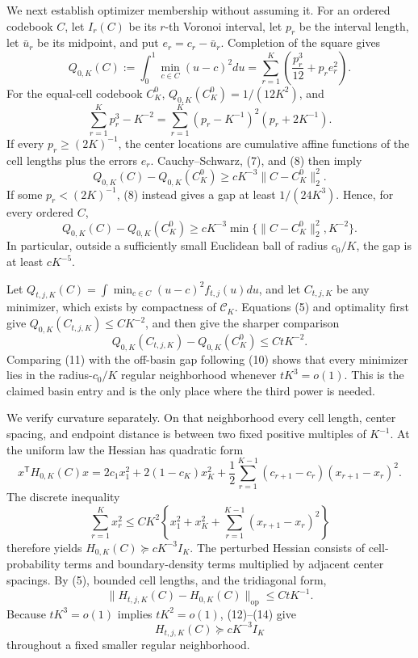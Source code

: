 We next establish optimizer membership without assuming it.  For an ordered codebook \(C\), let \(I_r(C)\) be its \(r\)-th Voronoi interval, let \(p_r\) be the interval length, let \(\bar u_r\) be its midpoint, and put \(e_r=c_r-\bar u_r\).  Completion of the square gives
\[
 Q_{0,K}(C):=\int_0^1\min_{c\in C}(u-c)^2du
 =\sum_{r=1}^K\left(\frac{p_r^3}{12}+p_re_r^2\right).                                    \tag{7}
\]
For the equal-cell codebook \(C_K^0\), \(Q_{0,K}(C_K^0)=1/(12K^2)\), and
\[
 \sum_{r=1}^Kp_r^3-K^{-2}
 =\sum_{r=1}^K(p_r-K^{-1})^2(p_r+2K^{-1}).                                                \tag{8}
\]
If every \(p_r\geq(2K)^{-1}\), the center locations are cumulative affine functions of the cell lengths plus the errors \(e_r\).  Cauchy--Schwarz, (7), and (8) then imply
\[
 Q_{0,K}(C)-Q_{0,K}(C_K^0)\geq cK^{-3}\|C-C_K^0\|_2^2.                                 \tag{9}
\]
If some \(p_r<(2K)^{-1}\), (8) instead gives a gap at least \(1/(24K^3)\).  Hence, for every ordered \(C\),
\[
 Q_{0,K}(C)-Q_{0,K}(C_K^0)
 \geq cK^{-3}\min\{\|C-C_K^0\|_2^2,K^{-2}\}.                                         \tag{10}
\]
In particular, outside a sufficiently small Euclidean ball of radius \(c_0/K\), the gap is at least \(cK^{-5}\).

Let \(Q_{t,j,K}(C)=\int\min_{c\in C}(u-c)^2f_{t,j}(u)du\), and let \(C_{t,j,K}\) be any minimizer, which exists by compactness of \(\mathcal C_K\).  Equations (5) and optimality first give \(Q_{0,K}(C_{t,j,K})\leq C K^{-2}\), and then give the sharper comparison
\[
 Q_{0,K}(C_{t,j,K})-Q_{0,K}(C_K^0)\leq CtK^{-2}.                                         \tag{11}
\]
Comparing (11) with the off-basin gap following (10) shows that every minimizer lies in the radius-\(c_0/K\) regular neighborhood whenever \(tK^3=o(1)\).  This is the claimed basin entry and is the only place where the third power is needed.

We verify curvature separately.  On that neighborhood every cell length, center spacing, and endpoint distance is between two fixed positive multiples of \(K^{-1}\).  At the uniform law the Hessian has quadratic form
\[
 x^{\mathsf T}H_{0,K}(C)x
 =2c_1x_1^2+2(1-c_K)x_K^2
 +\frac12\sum_{r=1}^{K-1}(c_{r+1}-c_r)(x_{r+1}-x_r)^2.                                  \tag{12}
\]
The discrete inequality
\[
 \sum_{r=1}^Kx_r^2\leq CK^2\left\{x_1^2+x_K^2+
 \sum_{r=1}^{K-1}(x_{r+1}-x_r)^2\right\}                                                \tag{13}
\]
therefore yields \(H_{0,K}(C)\succeq cK^{-3}I_K\).  The perturbed Hessian consists of cell-probability terms and boundary-density terms multiplied by adjacent center spacings.  By (5), bounded cell lengths, and the tridiagonal form,
\[
 \|H_{t,j,K}(C)-H_{0,K}(C)\|_{\mathrm{op}}\leq CtK^{-1}.                               \tag{14}
\]
Because \(tK^3=o(1)\) implies \(tK^2=o(1)\), (12)--(14) give
\[
 H_{t,j,K}(C)\succeq cK^{-3}I_K                                                        \tag{15}
\]
throughout a fixed smaller regular neighborhood.

